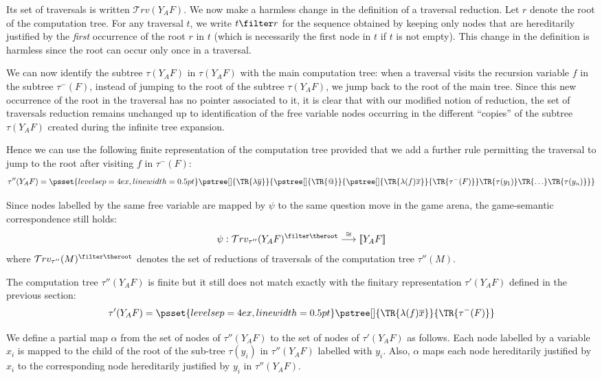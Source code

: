 \documentclass{article}
\newcommand{\sem}[1]{{[\![ #1 ]\!]}}
\newcommand{\travset}{\mathcal{T}rv}
\newcommand{\tree}[2][]{\pstree[#1]{\TR{#2}}}
\newcommand{\pssetcomptree}{\psset{levelsep=4ex,linewidth=0.5pt}}
\begin{document}
Its set of traversals is written $\travset(Y_A F)$. We now make a
harmless change in the definition of a traversal reduction. Let $r$
denote the root of the computation tree. For any traversal $t$, we
write  $t \filter r$ for the sequence obtained by keeping only nodes
that are hereditarily justified by the \emph{first} occurrence of
the root $r$ in $t$ (which is necessarily the first node in $t$ if
$t$ is not empty). This change in the definition is harmless since
the root can occur only once in a traversal.

We can now identify the subtree $\tau(Y_A F)$ in $\tau(Y_A F)$ with
the main computation tree: when a traversal visits the recursion
variable $f$ in the subtree $\tau^-(F)$, instead of jumping to the
root of the subtree $\tau(Y_A F)$, we jump back to the root of the
main tree. Since this new occurrence of the root in the traversal
has no pointer associated to it, it is clear that with our modified
notion of reduction, the set of traversals reduction remains
unchanged up to identification of the free variable nodes occurring
in the different ``copies'' of the subtree $\tau(Y_A F)$ created
during the infinite tree expansion.

Hence we can use the following finite representation of the
computation tree  provided that we add a further rule permitting
the traversal to jump to the root after visiting $f$ in
$\tau^-(F)$:
$$\tau''(Y_A F) = \pssetcomptree\tree{ \lambda \overline{y}}
     {  \tree{@}
               { \tree{ \lambda (f) \overline{x}}{\TR{\tau^-(F)}}
            \TR{\tau(y_1)}
            \TR{\ldots}
            \TR{\tau(y_n)}
                }
    }
$$

Since nodes labelled by the same free variable are mapped by $\psi$ to the same question move in the game arena, the game-semantic correspondence still holds:
$$ \psi : \travset_{\tau''}( Y_A F )^{\filter \theroot} \stackrel{\cong}{\longrightarrow} \sem{Y_A F}$$
where $\travset_{\tau''}(M)^{\filter \theroot}$ denotes the set of
reductions of traversals of the computation tree $\tau''(M)$.


The computation tree $\tau''(Y_A F)$ is finite but it still does not match exactly with the finitary representation $\tau'(Y_A F)$ defined in the previous section:
$$\tau'(Y_A F) = \pssetcomptree\tree{ \lambda (f) \overline{x}}{\TR{\tau^-(F)}}
$$

We define a partial map $\alpha$ from the set of nodes of $\tau''(Y_A F)$ to the set of nodes of $\tau'(Y_A F)$ as follows. Each node labelled by a variable $x_i$ is mapped to the child of the root of the sub-tree $\tau(y_i)$ in $\tau''(Y_A F)$ labelled with $y_i$. Also, $\alpha$ maps each node hereditarily justified by $x_i$ to the corresponding node hereditarily justified by $y_i$ in $\tau''(Y_A F)$.
\end{document}
